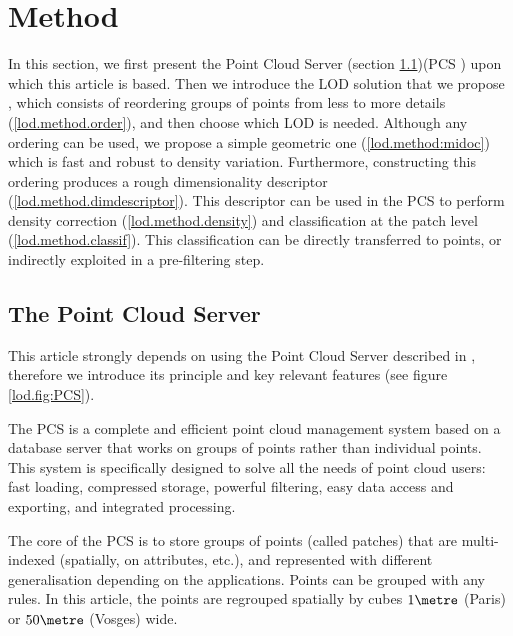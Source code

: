 

\section{Method}
	\label{lod.sec:method}
	
	In this section, we first present the Point Cloud Server (section \ref{lod.method.PCS})(PCS \cite{cura2015})
	upon which this article is based. Then we introduce the LOD solution that we propose 
	, which consists of reordering groups of points from less to more details (\ref{lod.method.order}), and then choose which LOD is needed.
	Although any ordering can be used, we propose a simple geometric one (\ref{lod.method:midoc}) which is fast and robust to density variation. 
	Furthermore, constructing this ordering produces a rough dimensionality descriptor (\ref{lod.method.dimdescriptor}). 
	This descriptor can be used in the PCS to perform density correction (\ref{lod.method.density}) and classification at the patch level (\ref{lod.method.classif}). This classification can be directly transferred to points, or indirectly exploited in a pre-filtering step.
	
	\subsection{The Point Cloud Server}
	\label{lod.method.PCS}
		
		This article strongly depends on using the Point Cloud Server described in \cite{cura2015},
		therefore we introduce its principle and key relevant features (see figure \ref{lod.fig:PCS}).
		
		The PCS is a complete and efficient point cloud management system based on a database server that works on groups of points rather than individual points.
		This system is specifically designed to solve all the needs of point cloud users:
		fast loading, compressed storage, powerful filtering, easy data access and exporting, and integrated processing.
		
		The core of the PCS is to store groups of points (called patches) that are multi-indexed (spatially, on attributes, etc.), and represented with different generalisation depending on the applications.
		Points can be grouped with any rules.
		In this article, the points are regrouped spatially by cubes $1 \metre$ (Paris) or $50 \metre$ (Vosges) wide.
		
